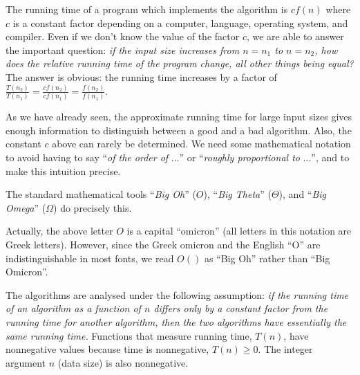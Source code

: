 The running time of a program which implements
the algorithm is $c  f(n)$ where $c$ is a constant factor depending
on a computer, language, operating system, and compiler. Even if we don't know 
the value of the factor \(c\), we are able to answer the important question:
\emph{if the input size increases from $n=n_{1}$ to $n=n_{2}$, how does
the relative running time of the program change, all other things being equal?}
The answer is obvious: the 
running time increases by a factor of 
\( 
\frac{T(n_{2})}{T(n_{1})} = 
\frac{c  f(n_{2})}{c  f(n_{1})} =  
\frac{f(n_{2})}{f(n_{1})}
\). 

As we have already seen, the approximate running time for large input
sizes gives enough information to distinguish between a good and a bad
algorithm. Also, the constant $c$ above can rarely be determined. We
need some mathematical notation to avoid having to say ``\emph{of the
order of} $\ldots$''  or ``\emph{roughly proportional to} $\ldots$'',
and to make this intuition precise.

The standard mathematical tools ``\emph{Big Oh}'' ($O$), ``\emph{Big
Theta}'' ($\Theta$), and ``\emph{Big Omega}'' ($\Omega$) do 
precisely this.

\begin{note}
Actually, the above letter $O$ is a capital ``omicron''  (all
letters in this notation are Greek letters). However, since the Greek
omicron and the English ``O'' are indistinguishable in most fonts, we
read $O()$ as ``Big Oh'' rather than ``Big Omicron''. 
\end{note}

The algorithms are analysed under the following assumption: \emph{if
the running time of an algorithm as a function of $n$ differs only by a
constant factor from the  running time for another algorithm, then the
two algorithms have essentially the same running time.} Functions that
measure running time, $T(n)$, have nonnegative values because time is
nonnegative, $T(n) \ge 0$. The integer argument $n$ (data size) is also
nonnegative.

